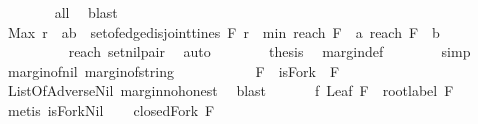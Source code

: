 \begin{isabellebody}
\ \ \ \ \ \ \isamarkupfalse%
\ all\ \isamarkupfalse%
\ blast\ \ \isanewline
\ \ \ \ \isamarkupfalse%
\ {\isachardoublequoteopen}Max\ {\isacharbraceleft}r{\isachardot}\ {\isacharparenleft}{\isasymexists}\ {\isacharparenleft}a{\isacharcomma}b{\isacharparenright}\ {\isasymin}\ set{\isacharunderscore}of{\isacharunderscore}edge{\isacharunderscore}disjoint{\isacharunderscore}tines\ F{\isachardot}\ r\ {\isacharequal}\ min\ {\isacharparenleft}reach\ F\ {\isacharbrackleft}{\isacharbrackright}\ a{\isacharparenright}\ {\isacharparenleft}reach\ F\ {\isacharbrackleft}{\isacharbrackright}\ b{\isacharparenright}{\isacharparenright}{\isacharbraceright}\ {\isacharequal}\ {}{\isachardoublequoteclose}\isanewline
\ \ \ \ \ \ \ \ \isamarkupfalse%
\ reach{}\ set{\isacharunderscore}nil{\isacharunderscore}pair\ \isamarkupfalse%
\ auto\ \ \isanewline
\ \ \ \ \isamarkupfalse%
\ {\isacharquery}thesis\ \isamarkupfalse%
\ margin{\isacharunderscore}def\isanewline
\ \ \ \ \ \ \isamarkupfalse%
\ simp\isanewline
{}\isamarkupfalse%
%
\endisatagproof
{\isafoldproof}%
%
\isadelimproof
\ \isanewline
%
\endisadelimproof
\ \ \isanewline
{}\isamarkupfalse%
\ margin{\isacharunderscore}of{\isacharunderscore}nil{\isacharcolon}\ {\isachardoublequoteopen}margin{\isacharunderscore}of{\isacharunderscore}string\ {\isacharbrackleft}{\isacharbrackright}\ {\isacharequal}\ {}{\isachardoublequoteclose}\isanewline
%
\isadelimproof
\ \ %
\endisadelimproof
%
\isatagproof
{}\isamarkupfalse%
\ {\isacharminus}\isanewline
\ \ \isamarkupfalse%
\ F\ \ {\isachardoublequoteopen}isFork\ {\isacharbrackleft}{\isacharbrackright}\ F{\isachardoublequoteclose}\isanewline
\ \ \ \ \isamarkupfalse%
\ ListOfAdverse{\isachardot}Nil\ margin{\isacharunderscore}no{\isacharunderscore}honest\ \isamarkupfalse%
\ blast\ \isanewline
\ \ \isamarkupfalse%
\ \isamarkupfalse%
\ f{}{\isacharcolon}\ {\isachardoublequoteopen}Leaf\ F\ {\isasymand}\ root{\isacharunderscore}label{\isacharunderscore}{}\ F{\isachardoublequoteclose}\ \isanewline
\ \ \ \ \isamarkupfalse%
\ {\isacharparenleft}metis\ isFork{\isacharunderscore}Nil{\isacharparenright}\isanewline
\ \ \isamarkupfalse%
\ {\isachardoublequoteopen}closedFork\ F\ {\isacharbrackleft}{\isacharbrackright}{\isachardoublequoteclose}\ \isanewline

\end{isabellebody}
